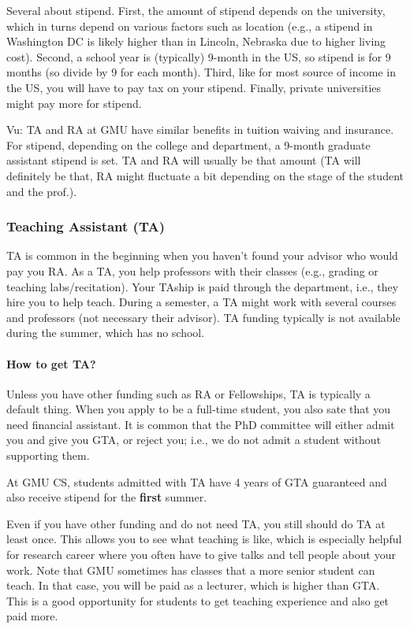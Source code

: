 \documentclass[11pt]{article}
\newenvironment{commentbox}{
 \small
    \begin{cbox}
 }{
   \end{cbox}
}
\begin{document}
Several about stipend. First, the amount of stipend depends on the university, which in turns depend on various factors such as location (e.g., a stipend in Washington DC is likely higher than in Lincoln, Nebraska due to higher living cost). Second, a school year is (typically) 9-month in the US, so stipend is for 9 months (so divide by 9 for each month). Third, like for most source of income in the US, you will have to pay tax on your stipend. Finally, private universities might pay more for stipend.

\begin{commentbox}
Vu: TA and RA at GMU have similar benefits in tuition waiving and insurance.  For stipend, depending on the college and department, a 9-month graduate assistant stipend is set.  TA and RA will usually be that amount (TA will definitely be that, RA might fluctuate a bit depending on the stage of the student and the prof.). 
\end{commentbox}

\subsubsection{Teaching Assistant (TA)}

TA is common in the beginning when you haven't found your advisor who would pay you RA. As a TA, you help professors with their classes (e.g., grading or teaching labs/recitation). Your TAship is paid through the department, i.e., they hire you to help teach.  During a semester, a TA might work with several courses and professors (not necessary their advisor).  TA funding typically is not available during the summer, which has no school.

\paragraph{How to get TA?}  Unless you have other funding such as RA or Fellowships, TA is typically a default thing. When you apply to be a full-time student, you also sate that you need financial assistant. It is common that the PhD committee will either admit you and give you GTA, or reject you; i.e., we do not admit a student without supporting them.  

\begin{commentbox}
At GMU CS, students admitted with TA have  4 years of GTA guaranteed and also receive  stipend for the \textbf{first} summer.
\end{commentbox}

Even if you have other funding and do not need TA, you still should do TA at least once.  This allows you to see what teaching is like, which is especially helpful for research career where you often have to give talks and tell people about your work. Note that GMU sometimes has classes that a more senior student can teach.  In that case, you will be paid as a lecturer, which is higher than GTA.  This is a good opportunity for students to get teaching experience and also get paid more.
\end{document}
